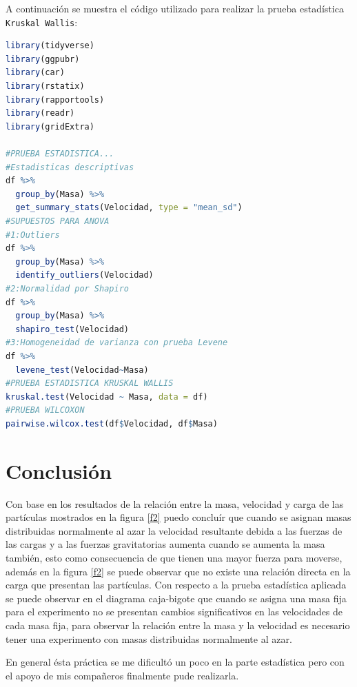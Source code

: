 \documentclass{article}
\begin{document}
A continuación se muestra el código utilizado para realizar la prueba estadística \texttt{Kruskal Wallis}:

\lstset{style=mystyle}
\begin{lstlisting}[language=R, caption= Código para las pruebas estadísticas \texttt{Kruskal Wallis} y \texttt{Wilcoxon}.]
library(tidyverse)
library(ggpubr)
library(car)
library(rstatix)
library(rapportools)
library(readr)
library(gridExtra)

#PRUEBA ESTADISTICA...
#Estadisticas descriptivas
df %>%
  group_by(Masa) %>%
  get_summary_stats(Velocidad, type = "mean_sd")
#SUPUESTOS PARA ANOVA
#1:Outliers
df %>%
  group_by(Masa) %>%
  identify_outliers(Velocidad)
#2:Normalidad por Shapiro
df %>%
  group_by(Masa) %>%
  shapiro_test(Velocidad)
#3:Homogeneidad de varianza con prueba Levene
df %>%
  levene_test(Velocidad~Masa)
#PRUEBA ESTADISTICA KRUSKAL WALLIS
kruskal.test(Velocidad ~ Masa, data = df)
#PRUEBA WILCOXON
pairwise.wilcox.test(df$Velocidad, df$Masa)
\end{lstlisting}

\newpage
\section{Conclusi\'{o}n}
Con base en los resultados de la relación entre la masa, velocidad y carga de las partículas mostrados en la figura  \ref{f2} puedo concluír que cuando se asignan masas distribuidas normalmente al azar la velocidad resultante debida a las fuerzas de las cargas y a las fuerzas gravitatorias aumenta cuando se aumenta la masa también, esto como consecuencia de que tienen una mayor fuerza para moverse, además en la figura \ref{f2} se puede observar que no existe una relación directa en la carga que presentan las partículas. Con respecto a la prueba estadística aplicada se puede observar en el diagrama caja-bigote que cuando se asigna una masa fija para el experimento no se presentan cambios significativos en las velocidades de cada masa fija, para observar la relación entre la masa y la velocidad es necesario tener una experimento con masas distribuidas normalmente al azar.
\smallskip

En general ésta práctica se me dificultó un poco en la parte estadística pero con el apoyo de mis compañeros finalmente pude realizarla.
\newpage



\end{document}
